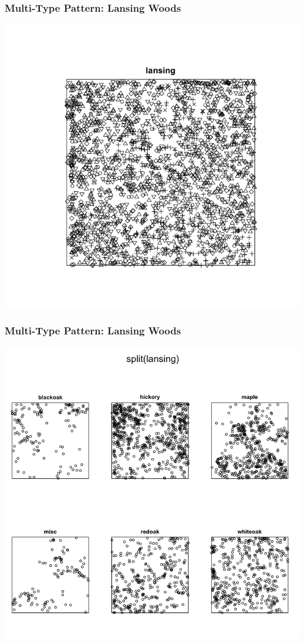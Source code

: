 \documentclass[nototal]{beamer}
\begin{document}
	 \begin{frame}
	   \frametitle{Multi-Type Pattern: Lansing Woods}
	   \begin{center}
	     \includegraphics[width=.65\linewidth]{lansing.png}
	   \end{center}
	 \end{frame}

	 \begin{frame}
	   \frametitle{Multi-Type Pattern: Lansing Woods}
	   \begin{center}
	     \includegraphics[width=.65\linewidth]{lansingSplit.png}
	   \end{center}
	 \end{frame}
\end{document}
